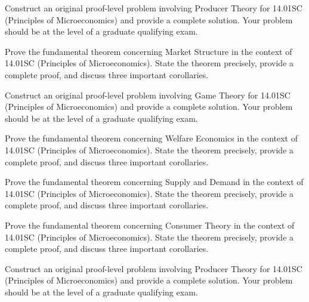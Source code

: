 \documentclass[12pt,a4paper]{exam}
\begin{document}
\begin{questions}
\vspace{0.3cm}

\question[4]
Construct an original proof-level problem involving Producer Theory for 14.01SC (Principles of Microeconomics) and provide a complete solution. Your problem should be at the level of a graduate qualifying exam.

\vspace{0.3cm}

\question[3]
Prove the fundamental theorem concerning Market Structure in the context of 14.01SC (Principles of Microeconomics). State the theorem precisely, provide a complete proof, and discuss three important corollaries.

\vspace{0.3cm}

\question[3]
Construct an original proof-level problem involving Game Theory for 14.01SC (Principles of Microeconomics) and provide a complete solution. Your problem should be at the level of a graduate qualifying exam.

\vspace{0.3cm}

\question[4]
Prove the fundamental theorem concerning Welfare Economics in the context of 14.01SC (Principles of Microeconomics). State the theorem precisely, provide a complete proof, and discuss three important corollaries.

\vspace{0.3cm}

\question[3]
Prove the fundamental theorem concerning Supply and Demand in the context of 14.01SC (Principles of Microeconomics). State the theorem precisely, provide a complete proof, and discuss three important corollaries.

\vspace{0.3cm}

\question[5]
Prove the fundamental theorem concerning Consumer Theory in the context of 14.01SC (Principles of Microeconomics). State the theorem precisely, provide a complete proof, and discuss three important corollaries.

\vspace{0.3cm}

\question[4]
Construct an original proof-level problem involving Producer Theory for 14.01SC (Principles of Microeconomics) and provide a complete solution. Your problem should be at the level of a graduate qualifying exam.

\vspace{0.3cm}


\end{questions}
\end{document}

